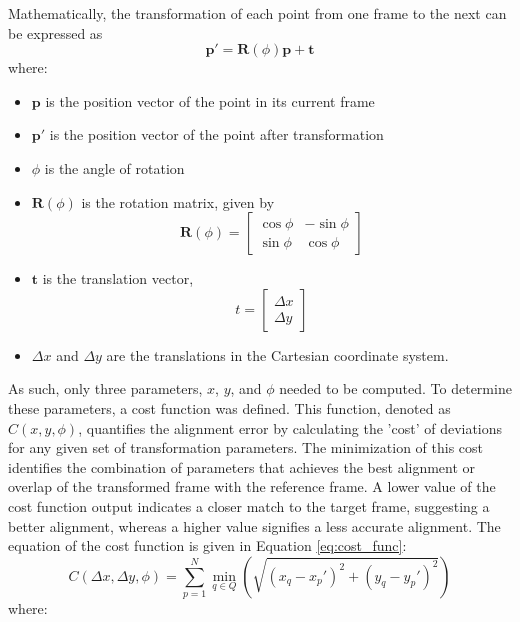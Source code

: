 \documentclass{micro-econ-thesis}
\begin{document}
Mathematically, the transformation of each point from one frame to the next can be expressed as 
\begin{equation}
	\mathbf{p'} = \mathbf{R}(\phi) \mathbf{p} + \mathbf{t}
	\label{eq:rot} 
\end{equation}
where: 
\begin{itemize}
	\item $\mathbf{p}$ is the position vector of the point in its current frame
	\item $\mathbf{p'}$ is the position vector of the point after transformation
	\item $\phi$ is the angle of rotation
	\item $\mathbf{R}(\phi)$  is the rotation matrix, given by 
	 \[
	 \mathbf{R}(\phi) = 
	 \begin{bmatrix}
	 	\cos \phi & -\sin \phi \\
	 	\sin \phi & \cos \phi
	 \end{bmatrix}
	 \]
	 
	 \item $\mathbf{t}$ is the translation vector,
	 	\[
	 	t = \begin{bmatrix}
	 		\Delta x \\
	 		\Delta y
	 	\end{bmatrix}
	 	\]
 	\item $\Delta x$ and $\Delta y$ are the translations in the Cartesian coordinate system. 
\end{itemize}   
As such, only three parameters, $x$, $y$, and $\phi$ needed to be computed. To determine these parameters, a cost function was defined. This function, denoted as $C(x,y,\phi)$, quantifies the alignment error by calculating the 'cost' of deviations for any given set of transformation parameters. The minimization of this cost identifies the combination of parameters that achieves the best alignment or overlap of the transformed frame with the reference frame. A lower value of the cost function output indicates a closer match to the target frame, suggesting a better alignment, whereas a higher value signifies a less accurate alignment. The equation of the cost function is given in Equation \ref{eq:cost_func}:  
\begin{equation}
	C(\Delta x, \Delta y, \phi) = \sum_{p=1}^{N} \min_{q \in Q} \left( \sqrt{(x_q - x_p')^2 + (y_q - y_p')^2} \right)
	\label{eq:cost_func}
\end{equation}
where:
\end{document}
